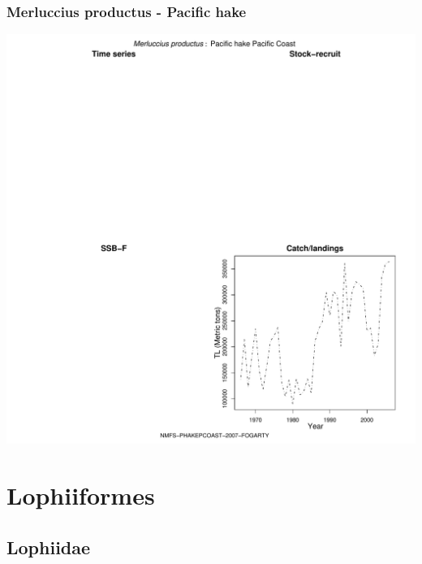 \subsubsection{Merluccius productus - Pacific hake}
\begin{center}
\includegraphics[width=1.2\textwidth]{../R/figures/NMFS-PHAKEPCOAST-2007-FOGARTY.pdf}
\end{center}

\section{Lophiiformes}

\subsection{Lophiidae}

